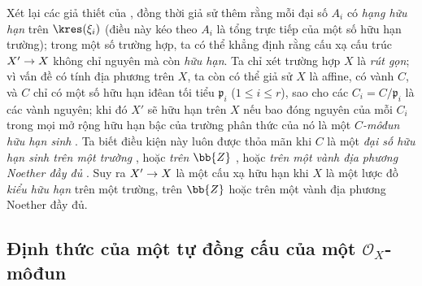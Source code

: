 \documentclass[oneside,10pt]{amsart}
\makeatletter
\renewcommand{\leq}{\leqslant}
\newcommand{\ega@arrow}[2]{\mathchoice{#1}{#2}{#2}{#2}}
\renewcommand{\to}{\ega@arrow{\longrightarrow}{\rightarrow}}
\let\EGAOriginalLabel\label
\renewcommand{\label}[1]{\phantomsection\EGAOriginalLabel{#1}}
\makeatother
\begin{document}
\begin{remark}[6.3.10]
\label{II.6.3.10}
Xét lại các giả thiết của , đồng thời giả sử thêm rằng mỗi đại số $A_i$ có \emph{hạng hữu hạn} trên $\kres(\xi_i)$ (điều này kéo theo $A_i$ là tổng trực tiếp của một số hữu hạn trường);
trong một số trường hợp, ta có thể khẳng định rằng cấu xạ cấu trúc $X'\to X$ không chỉ nguyên mà còn \emph{hữu hạn}.
Ta chỉ xét trường hợp $X$ là \emph{rút gọn};
vì vấn đề có tính địa phương trên $X$, ta còn có thể giả sử $X$ là affine, có vành $C$, và $C$ chỉ có một số hữu hạn iđêan tối tiểu $\mathfrak{p}_i$ ($1\leq i\leq r$), sao cho các $C_i=C/\mathfrak{p}_i$ là các vành nguyên;
khi đó $X'$ sẽ hữu hạn trên $X$ nếu bao đóng nguyên của mỗi $C_i$ trong mọi mở rộng hữu hạn bậc của trường phân thức của nó là một \emph{$C$-môđun hữu hạn sinh} .
Ta biết điều kiện này luôn được thỏa mãn khi $C$ là một \emph{đại số hữu hạn sinh trên một trường} \cite[t.~I, p.~267, th.~9]{I-13}, hoặc \emph{trên $\bb{Z}$} \cite[I,p.~93, th.~3]{I-9}, hoặc \emph{trên một vành địa phương Noether đầy đủ} \cite[p.~298]{II-25}.
Suy ra $X'\to X$ là một cấu xạ hữu hạn khi $X$ là một lược đồ \emph{kiểu hữu hạn} trên một trường, trên $\bb{Z}$ hoặc trên một vành địa phương Noether đầy đủ.
\end{remark}

\subsection{Định thức của một tự đồng cấu của một $\mathcal{O}_X$-môđun}
\label{subsection:II.6.4}
\end{document}
